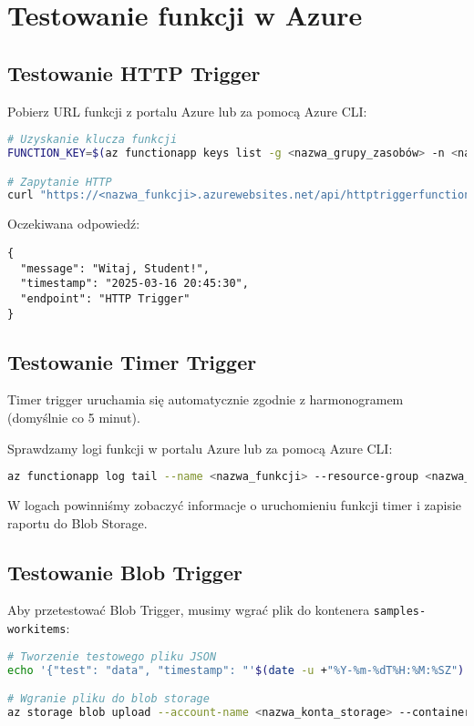 \documentclass{article}
\begin{document}
\section{Testowanie funkcji w Azure}

\subsection{Testowanie HTTP Trigger}

Pobierz URL funkcji z portalu Azure lub za pomocą Azure CLI:

\begin{lstlisting}[language=bash]
# Uzyskanie klucza funkcji
FUNCTION_KEY=$(az functionapp keys list -g <nazwa_grupy_zasobów> -n <nazwa_funkcji> --query "functionKeys.default" -o tsv)

# Zapytanie HTTP
curl "https://<nazwa_funkcji>.azurewebsites.net/api/httptriggerfunction?name=Student&code=$FUNCTION_KEY"
\end{lstlisting}

Oczekiwana odpowiedź:
\begin{lstlisting}[]
{
  "message": "Witaj, Student!",
  "timestamp": "2025-03-16 20:45:30",
  "endpoint": "HTTP Trigger"
}
\end{lstlisting}

\subsection{Testowanie Timer Trigger}

Timer trigger uruchamia się automatycznie zgodnie z harmonogramem (domyślnie co 5 minut).

Sprawdzamy logi funkcji w portalu Azure lub za pomocą Azure CLI:

\begin{lstlisting}[language=bash]
az functionapp log tail --name <nazwa_funkcji> --resource-group <nazwa_grupy_zasobów>
\end{lstlisting}

W logach powinniśmy zobaczyć informacje o uruchomieniu funkcji timer i zapisie raportu do Blob Storage.

\subsection{Testowanie Blob Trigger}

Aby przetestować Blob Trigger, musimy wgrać plik do kontenera \texttt{samples-workitems}:

\begin{lstlisting}[language=bash]
# Tworzenie testowego pliku JSON
echo '{"test": "data", "timestamp": "'$(date -u +"%Y-%m-%dT%H:%M:%SZ")'"}' > test-file.json

# Wgranie pliku do blob storage
az storage blob upload --account-name <nazwa_konta_storage> --container-name samples-workitems --name test-blob.json --file test-file.json --auth-mode login
\end{lstlisting}
\end{document}
